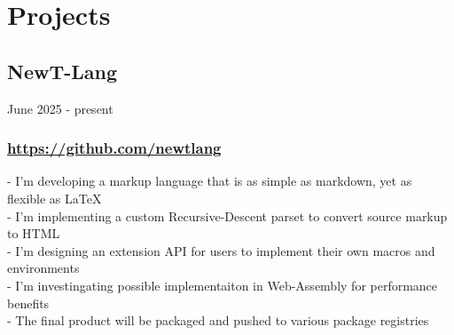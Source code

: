 \newpage

\section{Projects}


\subsection{NewT-Lang} June 2025 - present \\
\subsubsection{\href{https://github.com/newtlang}{https://github.com/newtlang}}
-\:  I'm developing a markup language that is as simple as markdown, yet as flexible as \LaTeX \\
-\:  I'm implementing a custom Recursive-Descent parset to convert source markup to HTML \\ 
-\:  I'm designing an extension API for users to implement their own macros and environments \\ 
-\:  I'm investingating possible implementaiton in Web-Assembly for performance benefits \\ 
-\:  The final product will be packaged and pushed to various package registries \\ 


